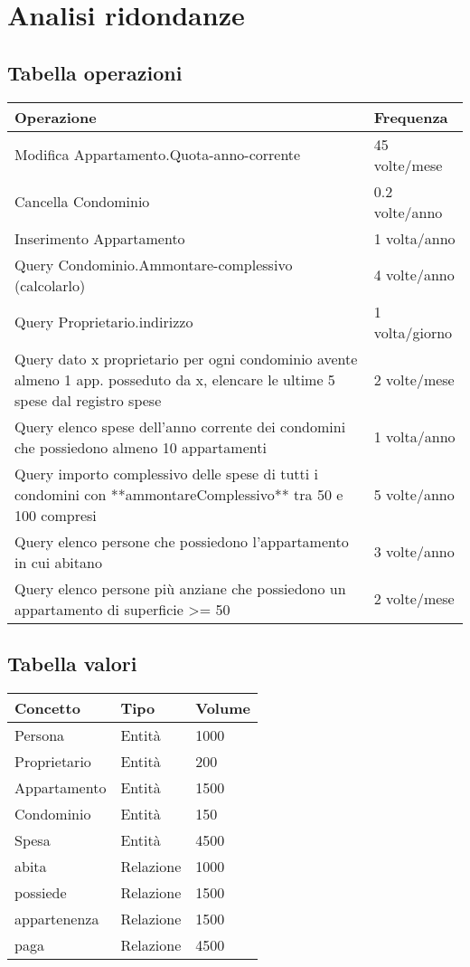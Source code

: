 \section{Analisi ridondanze}

\subsection{Tabella operazioni}

\begin{tabular}{|p{260pt}|l|}
	\hline
	Operazione & Frequenza \\ \hline
	Modifica Appartamento.Quota-anno-corrente & 45 volte/mese \\ \hline
	Cancella Condominio & 0.2 volte/anno \\ \hline
	Inserimento Appartamento & 1 volta/anno \\ \hline
	Query Condominio.Ammontare-complessivo (calcolarlo) & 4 volte/anno \\ \hline
	Query Proprietario.indirizzo & 1 volta/giorno \\ \hline
	Query dato x proprietario per ogni condominio avente almeno 1 app. posseduto da x, elencare le ultime 5 spese dal registro spese & 2 volte/mese \\ \hline
	Query elenco spese dell'anno corrente dei condomini che possiedono almeno 10 appartamenti & 1 volta/anno \\ \hline
	Query importo complessivo delle spese di tutti i condomini con **ammontareComplessivo** tra 50 e 100 compresi & 5 volte/anno \\ \hline
	Query elenco persone che possiedono l'appartamento in cui abitano & 3 volte/anno \\ \hline
	Query elenco persone più anziane che possiedono un appartamento di superficie >= 50 & 2 volte/mese \\ \hline
\end{tabular}

\subsection{Tabella valori}

\begin{tabular}{|l|l|l|}
	\hline
	Concetto & Tipo & Volume \\ \hline
	Persona & Entità & 1000 \\ \hline
	Proprietario & Entità & 200 \\ \hline
	Appartamento & Entità & 1500 \\ \hline
	Condominio & Entità & 150 \\ \hline
	Spesa & Entità & 4500 \\ \hline
	abita & Relazione & 1000 \\ \hline
	possiede & Relazione & 1500 \\ \hline
	appartenenza & Relazione & 1500 \\ \hline
	paga & Relazione & 4500 \\ \hline
\end{tabular}

